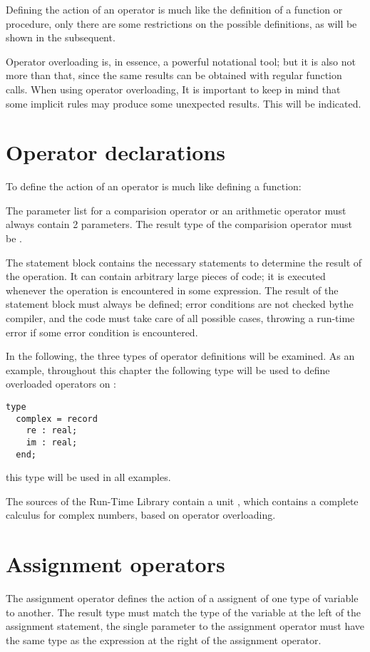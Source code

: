 \documentclass{report}
\begin{document}
Defining the action of an operator is much like the definition of a 
function or procedure, only there are some restrictions on the possible
definitions, as will be shown in the subsequent.

Operator overloading is, in essence, a powerful notational tool; 
but it is also not more than that, since the same results can be 
obtained with regular function calls. When using operator overloading,
It is important to keep in mind that some implicit rules may produce
some unexpected results. This will be indicated.

\section{Operator declarations}
To define the action of an operator is much like defining a function:

The parameter list for a comparision operator or an arithmetic operator
must always contain 2 parameters. The result type of the comparision
operator must be .

The statement block contains the necessary statements to determine the
result of the operation. It can contain arbitrary large pieces of code;
it is executed whenever the operation is encountered in some expression.
The result of the statement block must always be defined; error conditions
are not checked bythe compiler, and the code must take care of all possible
cases, throwing a run-time error if some error condition is encountered.

In the following, the three types of operator definitions will be examined.
As an example, throughout this chapter the following type will be used to
define overloaded operators on :
\begin{verbatim}
type 
  complex = record
    re : real;
    im : real;
  end;        
\end{verbatim}
this type will be used in all examples.

The sources of the Run-Time Library contain a unit , 
which contains a complete calculus for complex numbers, based on 
operator overloading.

\section{Assignment operators}

The assignment operator defines the action of a assignent of one type of
variable to another. The result type must match the type of the variable
at the left of the assignment statement, the single parameter to the
assignment operator must have the same type as the expression at the 
right of the assignment operator.
\end{document}
